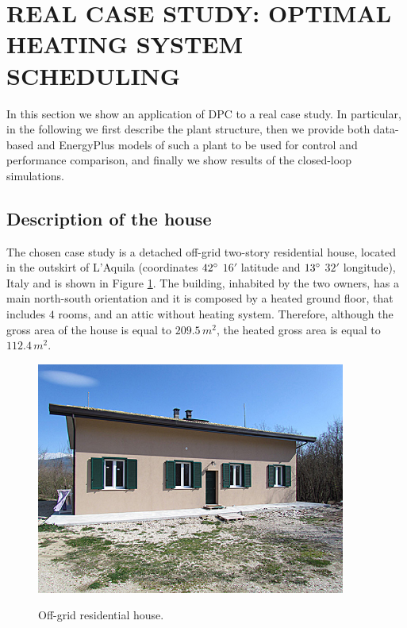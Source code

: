 \section{REAL CASE STUDY: OPTIMAL HEATING SYSTEM SCHEDULING} In this section we show an application of DPC to a real case study. In particular, in the following we first describe the plant structure, then we provide both data-based and EnergyPlus models of such a plant to be used for control and performance comparison, and finally we show results of the closed-loop simulations.

\subsection{Description of the house}\label{SS:descriptionHouse}
The chosen case study is a detached off-grid two-story residential house, located in the outskirt of L'Aquila (coordinates $42\degree$ $16'$ latitude and $13\degree$ $32'$ longitude), Italy and is shown in Figure \ref{F:house}. The building, inhabited by the two owners, has a main north-south orientation and it is composed by a heated ground floor, that includes $4$ rooms, and an attic without heating system. Therefore, although the gross area of the house is equal to $209.5\,m^2$, the heated gross area is equal to $112.4\,m^2$. 


\begin{figure}[h!]
	\begin{center}
		\includegraphics[width=24pc]{figures/Vista_sud.eps}
		\caption{Off-grid residential house.}
		\captionsetup{justification=centering}
		\label{F:house}
	\end{center}
\end{figure}

